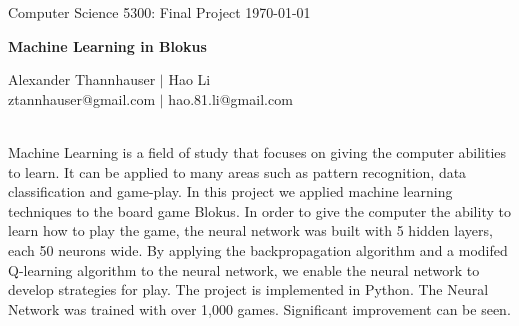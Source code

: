 \documentclass{report}
\begin{document}
	
	\noindent Computer Science 5300: Final Project \hfill \today\\
	\noindent\makebox[\linewidth]{\rule{6.5in}{2.0pt}}

	\begin{center}

	\smallskip
	{{\LARGE \bf Machine Learning in Blokus}}
	\smallskip

	\noindent\makebox[\linewidth]{\rule{6.5in}{2.0pt}}

	\bigskip

	{\large Alexander Thannhauser $|$ Hao Li \\
	\normalsize ztannhauser@gmail.com $|$ hao.81.li@gmail.com} \\

	\end{center}


	\\
		Machine Learning is a field of study that focuses on giving the computer abilities to learn. It can be applied to many areas such as pattern recognition, data classification and game-play. 
		In this project we applied machine learning techniques to the board game Blokus. In order to give the computer the ability to learn how to play the game, the neural network was built with
		5 hidden layers, each 50 neurons wide. By applying the backpropagation algorithm and a modifed Q-learning algorithm to the neural network, we enable the neural network to develop strategies for play. The project is implemented
		in Python. The Neural Network was trained with over 1,000 games. Significant improvement can be seen.\\
\end{document}
